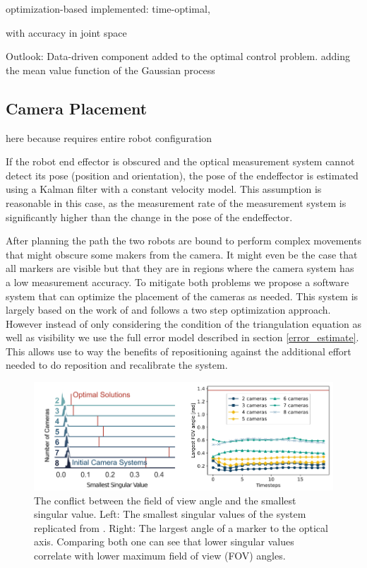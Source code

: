 \documentclass[5p,times,procedia]{elsarticle}
\begin{document}
optimization-based
implemented: time-optimal, 

with accuracy in joint space

Outlook: Data-driven component added to the optimal control problem.
adding the mean value function of the Gaussian process

\subsection{Camera Placement}
here because requires entire robot configuration

If the robot end effector is obscured and the optical measurement system cannot detect its pose (position and orientation), the pose of the endeffector is estimated using a Kalman filter with a constant velocity model. This assumption is reasonable in this case, as the measurement rate of the measurement system is significantly higher than the change in the pose of the endeffector.

After planning the path the two robots are bound to perform complex movements that might obscure some makers from the camera.
It might even be the case that all markers are visible but that they are in regions where the camera system has a low measurement accuracy.
To mitigate both problems we propose a software system that can optimize the placement of the cameras as needed.
This system is largely based on the work of \cite{camera_placement} and follows a two step optimization approach.
However instead of only considering the condition of the triangulation equation as well as visibility we use the full error model described in section \ref{error_estimate}.
This allows use to way the benefits of repositioning against the additional effort needed to do reposition and recalibrate the system.

\begin{figure}[!htb]
	\centering
	\includegraphics[width=\columnwidth]{graphics/fov_sv_conflict.png}
	\caption{The conflict between the field of view angle and the smallest singular value. Left: The smallest singular values of the system replicated from \cite{camera_placement}. Right: The largest angle of a marker to the optical axis.
		Comparing both one can see that lower singular values correlate with lower maximum field of view (FOV) angles.}
	\label{fig:fov_sv_conflict}
\end{figure}
\end{document}
